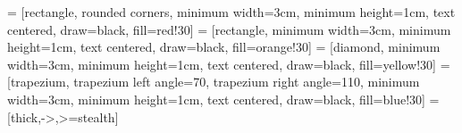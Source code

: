 \renewcommand{\abstractname}{РЕФЕРАТ}

\providecommand{\conclusionname}{ЗАКЛЮЧЕНИЕ}

\providecommand{\introductionname}{ВВЕДЕНИЕ}


\newcommand{\autofigure}[4]{%
    \begin{figure}[H]%
        \centering%
        \texttt{[image: \#1]}%
        \caption{#3}%
        \label{#4}%
    \end{figure}%
}

\newcommand{\autotable}[3]{%
    \begin{table}[H]%
        \centering%
        \caption{#2}%
        \label{#3}%
        #1%
    \end{table}%
}

\newcommand{\autoformula}[2]{%
    \begin{equation}%
        #1%
        \label{#2}%
    \end{equation}%
}

\newcommand{\autolist}[1]{%
    \begin{enumerate}%
        #1%
    \end{enumerate}%
}

\newcommand{\autobulletlist}[1]{%
    \begin{itemize}%
        #1%
    \end{itemize}%
}

\newcommand{\autofigref}[1]{%
    \textbf{рисунок \ref{#1}}%
}

\newcommand{\autotableref}[1]{%
    \textbf{таблица \ref{#1}}%
}

\newcommand{\autoformularef}[1]{%
    \textbf{формула \ref{#1}}%
}

\newcommand{\autopar}[1]{%
    \par\noindent#1%
}


 = [rectangle, rounded corners, minimum width=3cm, minimum height=1cm, text centered, draw=black, fill=red!30]
 = [rectangle, minimum width=3cm, minimum height=1cm, text centered, draw=black, fill=orange!30]
 = [diamond, minimum width=3cm, minimum height=1cm, text centered, draw=black, fill=yellow!30]
 = [trapezium, trapezium left angle=70, trapezium right angle=110, minimum width=3cm, minimum height=1cm, text centered, draw=black, fill=blue!30]
 = [thick,->,>=stealth]

